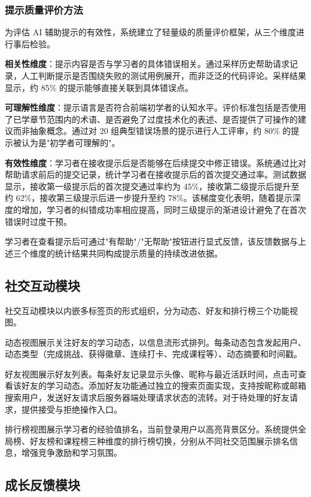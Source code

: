 \subsubsection{提示质量评价方法}

为评估 AI 辅助提示的有效性，系统建立了轻量级的质量评价框架，从三个维度进行事后检验。

\textbf{相关性维度}：提示内容是否与学习者的具体错误相关。通过采样历史帮助请求记录，人工判断提示是否围绕失败的测试用例展开，而非泛泛的代码评论。采样结果显示，约 85\% 的提示能够直接关联到具体错误点。

\textbf{可理解性维度}：提示语言是否符合前端初学者的认知水平。评价标准包括是否使用了已学章节范围内的术语、是否避免了过度技术化的表述、是否提供了可操作的建议而非抽象概念。通过对 20 组典型错误场景的提示进行人工评审，约 80\% 的提示被认为是"初学者可理解的"。

\textbf{有效性维度}：学习者在接收提示后是否能够在后续提交中修正错误。系统通过比对帮助请求前后的提交记录，统计学习者在接收提示后的首次提交通过率。测试数据显示，接收第一级提示后的首次提交通过率约为 45\%，接收第二级提示后提升至约 62\%，接收第三级提示后进一步提升至约 78\%。该梯度变化表明，随着提示深度的增加，学习者的纠错成功率相应提高，同时三级提示的渐进设计避免了在首次错误时过度干预。

学习者在查看提示后可通过"有帮助"/"无帮助"按钮进行显式反馈，该反馈数据与上述三个维度的统计结果共同构成提示质量的持续改进依据。
\subsection{社交互动模块}

社交互动模块以内嵌多标签页的形式组织，分为动态、好友和排行榜三个功能视图。

动态视图展示关注好友的学习动态，以信息流形式排列。每条动态包含发起用户、动态类型（完成挑战、获得徽章、连续打卡、完成课程等）、动态摘要和时间戳。

好友视图展示好友列表。每条好友记录显示头像、昵称与最近活跃时间，点击可查看该好友的学习动态。添加好友功能通过独立的搜索页面实现，支持按昵称或邮箱搜索用户，发送好友请求后服务器端处理请求状态的流转。对于待处理的好友请求，提供接受与拒绝操作入口。

排行榜视图展示学习者的经验值排名，当前登录用户以高亮背景区分。系统提供全局榜、好友榜和课程榜三种维度的排行榜切换，分别从不同社交范围展示排名信息，增强竞争激励和学习氛围。

\subsection{成长反馈模块}

